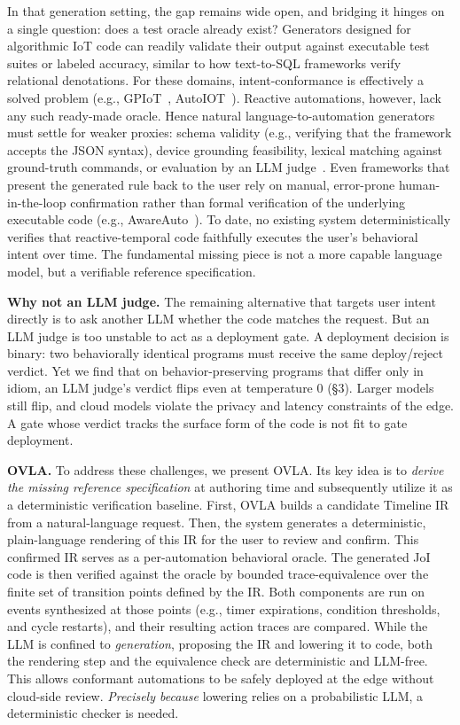 \documentclass[sigconf,nonacm,anonymous,review]{acmart}
\begin{document}
In that generation setting, the gap remains wide open, and bridging it hinges on a single question:
does a test oracle already exist? Generators designed for algorithmic IoT code can readily validate their output against executable test suites or labeled accuracy, similar to how text-to-SQL frameworks verify relational denotations. For these domains, intent-conformance is effectively a solved problem (e.g., GPIoT~\cite{gpiot}, AutoIOT~\cite{autoiot_mobicom}). Reactive automations, however, lack any such ready-made oracle. Hence natural language-to-automation generators must settle for weaker proxies: schema validity (e.g., verifying that the framework accepts the JSON syntax), device grounding feasibility, lexical matching against ground-truth commands, or evaluation by an LLM judge~\cite{llmjudge}. Even frameworks that present the generated rule back to the user rely on manual, error-prone human-in-the-loop confirmation rather than formal verification of the underlying executable code (e.g., AwareAuto~\cite{awareauto}). To date, no existing system deterministically verifies that reactive-temporal code faithfully executes the user's behavioral intent over time. The fundamental missing piece is not a more capable language model, but a verifiable reference specification.

\textbf{Why not an LLM judge.} The remaining alternative that targets user intent directly is to ask another LLM whether the code matches the request. But an LLM judge is too unstable to act as a deployment gate. A deployment decision is binary: two behaviorally identical programs must receive the same deploy/reject verdict. Yet we find that on behavior-preserving programs that differ only in idiom, an LLM judge's verdict flips even at temperature 0 (\S3). Larger models still flip, and cloud models violate the privacy and latency constraints of the edge. A gate whose verdict tracks the surface form of the code is not fit to gate deployment.

\textbf{OVLA.} To address these challenges, we present OVLA. Its key idea is to \emph{derive the missing reference specification} at authoring time and subsequently utilize it as a deterministic verification baseline.
First, OVLA builds a candidate Timeline IR from a natural-language request. Then, the system generates a deterministic, plain-language rendering of this IR for the user to review and confirm.
This confirmed IR serves as a per-automation behavioral oracle. The generated JoI code is then verified against the oracle by bounded trace-equivalence over the finite set of transition points defined by the IR. Both components are run on events synthesized at those points (e.g., timer expirations, condition thresholds, and cycle restarts), and their resulting action traces are compared. While the LLM is confined to \emph{generation}, proposing the IR and lowering it to code, both the rendering step and the equivalence check are deterministic and LLM-free. This allows conformant automations to be safely deployed at the edge without cloud-side review. \emph{Precisely because} lowering relies on a probabilistic LLM,
a deterministic checker is needed.
\end{document}

